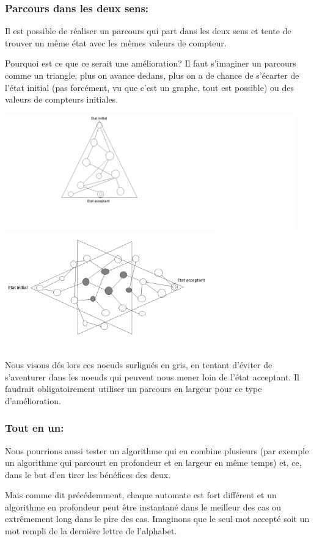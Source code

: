 \subsubsection{Parcours dans les deux sens:}
Il est possible de réaliser un parcours qui part dans les deux sens et tente de trouver un même état avec les mêmes valeurs de compteur. \par
Pourquoi est ce que ce serait une amélioration? Il faut s'imaginer un parcours comme un triangle, plus on avance dedans, plus on a de chance de s'écarter de l'état initial (pas forcément, vu que c'est un graphe, tout est possible) ou des valeurs de compteurs initiales.\par
\includegraphics[height=5cm]{a2.png}
\includegraphics[height=5cm]{a3.png}\par
Nous visons dés lors ces noeuds surlignés en gris, en tentant d'éviter de s'aventurer dans les noeuds qui peuvent nous mener loin de l'état acceptant. Il faudrait obligatoirement utiliser un parcours en largeur pour ce type d'amélioration.\par

\subsubsection{Tout en un:}
Nous pourrions aussi tester un algorithme qui en combine plusieurs (par exemple un algorithme qui parcourt en profondeur et en largeur en même temps) et, ce, dans le but d'en tirer les bénéfices des deux.\par
Mais comme dit précédemment, chaque automate est fort différent et un algorithme en profondeur peut être instantané dans le meilleur des cas ou extrêmement long dans le pire des cas. Imaginons que le seul mot accepté soit un mot rempli de la dernière lettre de l'alphabet.
